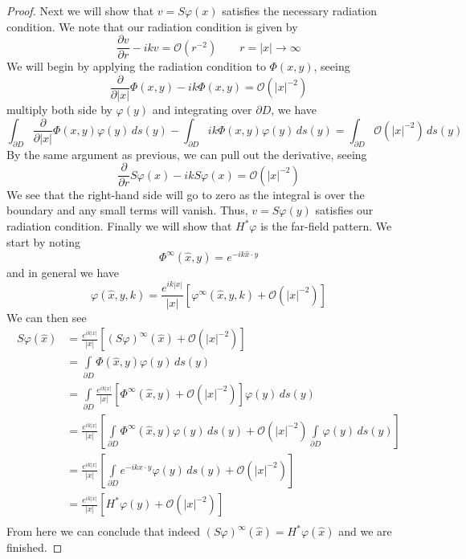 \documentclass[]{article}
\begin{document}
\begin{proof}
				Next we will show that $v = S\varphi(x)$ satisfies the necessary radiation condition. We note that our radiation condition is given by
				\begin{equation}
					\frac{\partial v}{\partial r} - ikv = \mathcal O(r^{-2}) \qquad r = |x| \to \infty
				\end{equation}
				We will begin by applying the radiation condition to $\Phi (x, y)$, seeing
				\begin{equation}
					\frac{\partial}{\partial |x|}\Phi (x, y) - ik \Phi (x, y) = \mathcal O(|x|^{-2})
				\end{equation}
				multiply both side by $\varphi(y)$ and integrating over $\partial D$, we have
				\begin{equation}
					\int_{\partial D}\frac{\partial}{\partial |x|}\Phi (x, y)\varphi(y)\, ds(y) - \int_{\partial D}ik \Phi (x, y)\varphi(y)\, ds(y) = \int_{\partial D}\mathcal O(|x|^{-2})\, ds(y)
				\end{equation}
				By the same argument as previous, we can pull out the derivative, seeing
				\begin{equation}
					\frac{\partial}{\partial r}S\varphi(x) - ikS\varphi(x) = \mathcal O(|x|^{-2})
				\end{equation}
				We see that the right-hand side will go to zero as the integral is over the boundary and any small terms will vanish. Thus, $v= S\varphi(y)$ satisfies our radiation condition.
				Finally we will show that $H^\ast \varphi$ is the far-field pattern. We start by noting
				\begin{equation}
					\Phi^\infty(\hat x, y) = e^{-ik\hat x\cdot y}
				\end{equation}
				and in general we have
				\begin{equation}
					\varphi(\hat x, y, k) = \frac{e^{ik|x|}}{|x|}\left[ \varphi^\infty(\hat x, y, k) + \mathcal O(|x|^{-2})\right] 
				\end{equation}
				We can then see
				\begin{align}
					S\varphi(\hat x) &= \frac{e^{ik|x|}}{|x|}\left[ (S\varphi)^\infty(\hat x) + \mathcal O(|x|^{-2})\right] \\
					&= \int\limits_{\partial D} \Phi(\hat x, y)\varphi(y)\, ds(y)\\
					&= \int\limits_{\partial D}\frac{e^{ik|x|}}{|x|}\left[ \Phi^\infty(\hat x, y) + \mathcal O(|x|^{-2})\right] \varphi(y)\, ds(y)\\
					&= \frac{e^{ik|x|}}{|x|}\left[ \int\limits_{\partial D} \Phi^\infty(\hat x, y)\varphi(y)\, ds(y) + \mathcal O(|x|^{-2})\int\limits_{\partial D} \varphi(y)\, ds(y)\right] \\
					&= \frac{e^{ik|x|}}{|x|}\left[ \int\limits_{\partial D} e^{-ik\hat x\cdot y}\varphi(y)\, ds(y) + \mathcal O(|x|^{-2})\right] \\
					&= \frac{e^{ik|x|}}{|x|}\left[ H^\ast \varphi(y) + \mathcal O(|x|^{-2})\right] \\
				\end{align}
				From here we can conclude that indeed $	(S\varphi)^\infty(\hat x) =H^\ast \varphi(\hat x)$ and we are finished.
			\end{proof}
\end{document}
